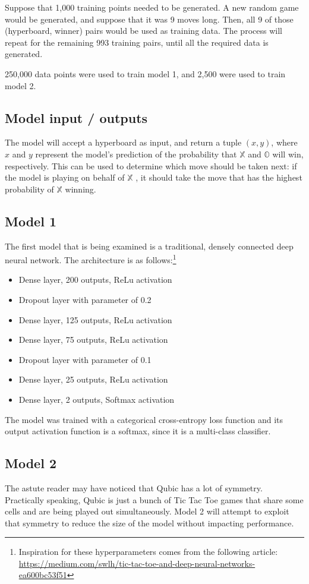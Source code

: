 \documentclass[11pt]{article}
\newcommand{\XX}{$\mathbb{X}$ }
\newcommand{\OO}{$\mathbb{O}$ }
\begin{document}
Suppose that 1,000 training points needed to be generated. A new random game would be generated, and suppose that it was 9 moves long. Then, all 9 of those (hyperboard, winner) pairs would be used as training data. The process will repeat for the remaining 993 training pairs, until all the required data is generated.

250,000 data points were used to train model 1, and 2,500 were used to train model 2.

\subsection{Model input / outputs}
The model will accept a hyperboard as input, and return a tuple $(x, y)$, where $x$ and $y$ represent the model's prediction of the probability that \XX and \OO will win, respectively. This can be used to determine which move should be taken next: if the model is playing on behalf of \XX, it should take the move that has the highest probability of \XX winning. 

\subsection{Model 1}
The first model that is being examined is a traditional, densely connected deep neural network. The architecture is as follows:\footnote{Inspiration for these hyperparameters comes from the following article: \url{https://medium.com/swlh/tic-tac-toe-and-deep-neural-networks-ea600bc53f51}}
\begin{itemize}
    \item Dense layer, 200 outputs, ReLu activation
    \item Dropout layer with parameter of 0.2
    \item Dense layer, 125 outputs, ReLu activation
    \item Dense layer, 75 outputs, ReLu activation
    \item Dropout layer with parameter of 0.1
    \item Dense layer, 25 outputs, ReLu activation
    \item Dense layer, 2 outputs, Softmax activation
\end{itemize}

The model was trained with a categorical cross-entropy loss function  and its output activation function is a softmax, since it is a multi-class classifier.

\subsection{Model 2}
The astute reader may have noticed that Qubic has a lot of symmetry. Practically speaking, Qubic is just a bunch of Tic Tac Toe games that share some cells and are being played out simultaneously. Model 2 will attempt to exploit that symmetry to reduce the size of the model without impacting performance.
\end{document}
